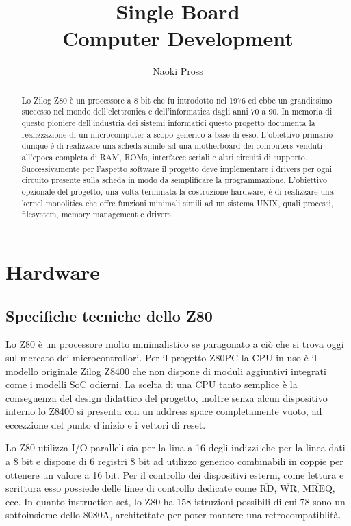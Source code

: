 \documentclass[a4paper, 11pt]{article}
\title{\prj Single Board \\ Computer Development }
\author{Naoki Pross}
\newcommand{\prj}{Z80\textmu PC\xspace}
\newcommand{\inv}[1]{\(\overline{\mbox{#1}}\)}
\begin{document}
\maketitle
\begin{abstract}

    Lo Zilog Z80 \`e un processore a 8 bit che fu introdotto nel 1976 ed ebbe
    un grandissimo successo nel mondo dell'elettronica e dell'informatica
    dagli anni 70 a 90. In memoria di questo pioniere dell'industria dei
    sistemi informatici questo progetto documenta la realizzazione di un
    microcomputer a scopo generico a base di esso. L'obiettivo primario
    dunque \`e di realizzare una scheda simile ad una motherboard dei
    computers venduti all'epoca completa di RAM, ROMs, interfacce seriali e
    altri circuiti di supporto. Successivamente per l'aspetto software il
    progetto deve implementare i drivers per ogni circuito presente sulla
    scheda in modo da semplificare la programmazione. L'obiettivo opzionale
    del progetto, una volta terminata la costruzione hardware, \`e di
    realizzare una kernel monolitica che offre funzioni minimali simili ad un
    sistema UNIX, quali processi, filesystem, memory management e drivers.

\end{abstract}

\break
\tableofcontents
\break

\section{Hardware}

\subsection{Specifiche tecniche dello Z80}
Lo Z80 \`e un processore molto minimalistico se paragonato a ci\`o che si
trova oggi sul mercato dei microcontrollori. Per il progetto \prj la CPU in
uso \`e il modello originale Zilog Z8400 che non dispone di moduli aggiuntivi
integrati come i modelli SoC odierni. La scelta di una CPU tanto semplice \`e
la conseguenza del design didattico del progetto, inoltre senza alcun
dispositivo interno lo Z8400 si presenta con un address space completamente
vuoto, ad eccezzione del punto d'inizio e i vettori di reset.

Lo Z80 utilizza I/O paralleli sia per la lina a 16 degli indizzi che per la
linea dati a 8 bit e dispone di 6 registri 8 bit ad utilizzo generico
combinabili in coppie per ottenere un valore a 16 bit. Per il controllo dei
dispositivi esterni, come lettura e scrittura esso possiede delle linee di
controllo dedicate come {\tt\inv{RD}}, {\tt\inv{WR}}, {\tt\inv{MREQ}}, ecc. In
quanto instruction set, lo Z80 ha 158 istruzioni possibili di cui 78 sono un
sottoinsieme dello 8080A, architettate per poter mantere una
retrocompatiblit\`a.
\end{document}
